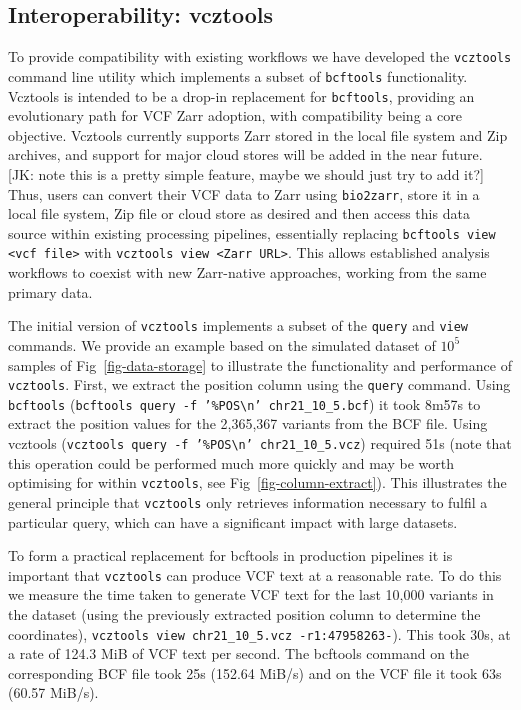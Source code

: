 \documentclass[a4paper,num-refs]{oup-contemporary}
\begin{document}
\subsection{Interoperability: vcztools}
To provide compatibility with existing workflows we have
developed the \texttt{vcztools} command line utility which
implements a subset of \texttt{bcftools} functionality.
Vcztools is intended to be a drop-in replacement for \texttt{bcftools},
providing an evolutionary path for VCF Zarr adoption,
with compatibility being a core objective.
Vcztools currently supports Zarr stored in the local file system
and Zip archives, and support for major cloud stores will be added in the near
future. [JK: note this is a pretty simple feature, maybe we should just try
to add it?]
Thus, users can convert their VCF data to Zarr using \texttt{bio2zarr},
store it in a local file system, Zip file or cloud store as desired
and then access this data source within existing processing pipelines,
essentially replacing \texttt{bcftools view <vcf file>} with
\texttt{vcztools view <Zarr URL>}.
This allows established analysis workflows to coexist with new Zarr-native
approaches, working from the same primary data.

The initial version of \texttt{vcztools} implements a subset of the \texttt{query}
and \texttt{view} commands. We provide an example based on the simulated
dataset of $10^5$ samples of Fig~\ref{fig-data-storage} to illustrate
the functionality and
performance of \texttt{vcztools}. First, we extract the position column
using the \texttt{query} command. Using \texttt{bcftools}
(\texttt{bcftools query -f '\%POS\textbackslash n' chr21\_10\_5.bcf})
it took 8m57s to extract the position values for the 2,365,367
variants from the BCF file.
Using vcztools
(\texttt{vcztools query -f '\%POS\textbackslash n' chr21\_10\_5.vcz})
required 51s (note that this operation could be performed much
more quickly and may be worth optimising for within \texttt{vcztools}, see
Fig~\ref{fig-column-extract}). This illustrates the general principle
that \texttt{vcztools} only retrieves information necessary to fulfil a particular
query, which can have a significant impact with large datasets.

To form a practical replacement for bcftools in production pipelines
it is important that \texttt{vcztools} can produce VCF text at a reasonable
rate. To do this we measure the time taken to generate VCF text for the
last 10,000 variants in the dataset (using the previously extracted
position column to determine the coordinates), \texttt{vcztools view
chr21\_10\_5.vcz -r1:47958263-}). This took 30s, at a rate of 124.3 MiB
of VCF text per second. The bcftools command on the corresponding
BCF file took 25s (152.64 MiB/s) and on the VCF file it took 63s (60.57 MiB/s).
\end{document}
